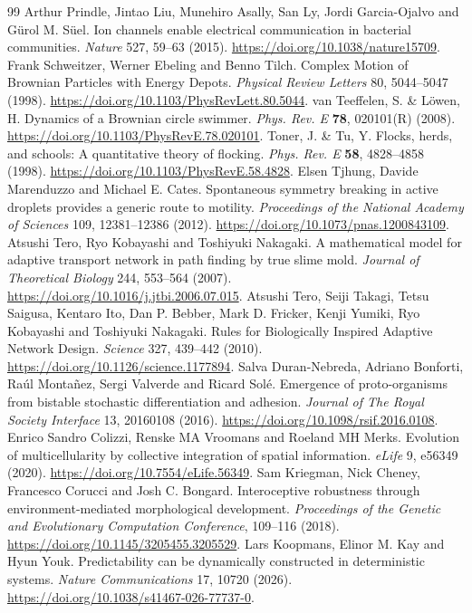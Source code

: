 \begin{thebibliography}{99}
 Arthur Prindle, Jintao Liu, Munehiro Asally, San Ly, Jordi Garcia-Ojalvo and G\"{u}rol M. S\"{u}el. Ion channels enable electrical communication in bacterial communities. \emph{Nature} 527, 59--63 (2015). \url{https://doi.org/10.1038/nature15709}.
 Frank Schweitzer, Werner Ebeling and Benno Tilch. Complex Motion of Brownian Particles with Energy Depots. \emph{Physical Review Letters} 80, 5044--5047 (1998). \url{https://doi.org/10.1103/PhysRevLett.80.5044}.
 van Teeffelen, S. \& L\"owen, H. Dynamics of a Brownian circle swimmer. \emph{Phys. Rev. E} \textbf{78}, 020101(R) (2008). \url{https://doi.org/10.1103/PhysRevE.78.020101}.
 Toner, J. \& Tu, Y. Flocks, herds, and schools: A quantitative theory of flocking. \emph{Phys. Rev. E} \textbf{58}, 4828--4858 (1998). \url{https://doi.org/10.1103/PhysRevE.58.4828}.
 Elsen Tjhung, Davide Marenduzzo and Michael E. Cates. Spontaneous symmetry breaking in active droplets provides a generic route to motility. \emph{Proceedings of the National Academy of Sciences} 109, 12381--12386 (2012). \url{https://doi.org/10.1073/pnas.1200843109}.
 Atsushi Tero, Ryo Kobayashi and Toshiyuki Nakagaki. A mathematical model for adaptive transport network in path finding by true slime mold. \emph{Journal of Theoretical Biology} 244, 553--564 (2007). \url{https://doi.org/10.1016/j.jtbi.2006.07.015}.
 Atsushi Tero, Seiji Takagi, Tetsu Saigusa, Kentaro Ito, Dan P. Bebber, Mark D. Fricker, Kenji Yumiki, Ryo Kobayashi and Toshiyuki Nakagaki. Rules for Biologically Inspired Adaptive Network Design. \emph{Science} 327, 439--442 (2010). \url{https://doi.org/10.1126/science.1177894}.
 Salva Duran-Nebreda, Adriano Bonforti, Ra\'{u}l Monta\~{n}ez, Sergi Valverde and Ricard Sol\'{e}. Emergence of proto-organisms from bistable stochastic differentiation and adhesion. \emph{Journal of The Royal Society Interface} 13, 20160108 (2016). \url{https://doi.org/10.1098/rsif.2016.0108}.
 Enrico Sandro Colizzi, Renske MA Vroomans and Roeland MH Merks. Evolution of multicellularity by collective integration of spatial information. \emph{eLife} 9, e56349 (2020). \url{https://doi.org/10.7554/eLife.56349}.
 Sam Kriegman, Nick Cheney, Francesco Corucci and Josh C. Bongard. Interoceptive robustness through environment-mediated morphological development. \emph{Proceedings of the Genetic and Evolutionary Computation Conference}, 109--116 (2018). \url{https://doi.org/10.1145/3205455.3205529}.
 Lars Koopmans, Elinor M. Kay and Hyun Youk. Predictability can be dynamically constructed in deterministic systems. \emph{Nature Communications} 17, 10720 (2026). \url{https://doi.org/10.1038/s41467-026-77737-0}.

\end{thebibliography}
